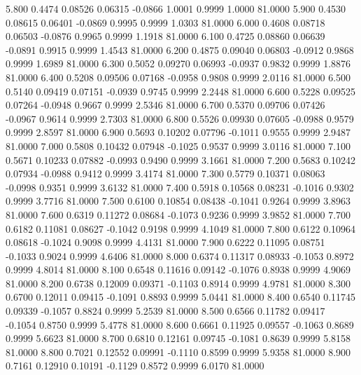    5.800   0.4474   0.08526   0.06315  -0.0866   1.0001   0.9999   1.0000  81.0000
   5.900   0.4530   0.08615   0.06401  -0.0869   0.9995   0.9999   1.0303  81.0000
   6.000   0.4608   0.08718   0.06503  -0.0876   0.9965   0.9999   1.1918  81.0000
   6.100   0.4725   0.08860   0.06639  -0.0891   0.9915   0.9999   1.4543  81.0000
   6.200   0.4875   0.09040   0.06803  -0.0912   0.9868   0.9999   1.6989  81.0000
   6.300   0.5052   0.09270   0.06993  -0.0937   0.9832   0.9999   1.8876  81.0000
   6.400   0.5208   0.09506   0.07168  -0.0958   0.9808   0.9999   2.0116  81.0000
   6.500   0.5140   0.09419   0.07151  -0.0939   0.9745   0.9999   2.2448  81.0000
   6.600   0.5228   0.09525   0.07264  -0.0948   0.9667   0.9999   2.5346  81.0000
   6.700   0.5370   0.09706   0.07426  -0.0967   0.9614   0.9999   2.7303  81.0000
   6.800   0.5526   0.09930   0.07605  -0.0988   0.9579   0.9999   2.8597  81.0000
   6.900   0.5693   0.10202   0.07796  -0.1011   0.9555   0.9999   2.9487  81.0000
   7.000   0.5808   0.10432   0.07948  -0.1025   0.9537   0.9999   3.0116  81.0000
   7.100   0.5671   0.10233   0.07882  -0.0993   0.9490   0.9999   3.1661  81.0000
   7.200   0.5683   0.10242   0.07934  -0.0988   0.9412   0.9999   3.4174  81.0000
   7.300   0.5779   0.10371   0.08063  -0.0998   0.9351   0.9999   3.6132  81.0000
   7.400   0.5918   0.10568   0.08231  -0.1016   0.9302   0.9999   3.7716  81.0000
   7.500   0.6100   0.10854   0.08438  -0.1041   0.9264   0.9999   3.8963  81.0000
   7.600   0.6319   0.11272   0.08684  -0.1073   0.9236   0.9999   3.9852  81.0000
   7.700   0.6182   0.11081   0.08627  -0.1042   0.9198   0.9999   4.1049  81.0000
   7.800   0.6122   0.10964   0.08618  -0.1024   0.9098   0.9999   4.4131  81.0000
   7.900   0.6222   0.11095   0.08751  -0.1033   0.9024   0.9999   4.6406  81.0000
   8.000   0.6374   0.11317   0.08933  -0.1053   0.8972   0.9999   4.8014  81.0000
   8.100   0.6548   0.11616   0.09142  -0.1076   0.8938   0.9999   4.9069  81.0000
   8.200   0.6738   0.12009   0.09371  -0.1103   0.8914   0.9999   4.9781  81.0000
   8.300   0.6700   0.12011   0.09415  -0.1091   0.8893   0.9999   5.0441  81.0000
   8.400   0.6540   0.11745   0.09339  -0.1057   0.8824   0.9999   5.2539  81.0000
   8.500   0.6566   0.11782   0.09417  -0.1054   0.8750   0.9999   5.4778  81.0000
   8.600   0.6661   0.11925   0.09557  -0.1063   0.8689   0.9999   5.6623  81.0000
   8.700   0.6810   0.12161   0.09745  -0.1081   0.8639   0.9999   5.8158  81.0000
   8.800   0.7021   0.12552   0.09991  -0.1110   0.8599   0.9999   5.9358  81.0000
   8.900   0.7161   0.12910   0.10191  -0.1129   0.8572   0.9999   6.0170  81.0000
